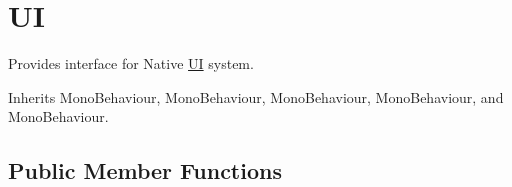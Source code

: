\hypertarget{class_voxel_busters_1_1_native_plugins_1_1_u_i}{}\section{U\+I}
\label{class_voxel_busters_1_1_native_plugins_1_1_u_i}


Provides interface for Native \hyperlink{class_voxel_busters_1_1_native_plugins_1_1_u_i}{U\+I} system.  




Inherits Mono\+Behaviour, Mono\+Behaviour, Mono\+Behaviour, Mono\+Behaviour, and Mono\+Behaviour.

\subsection*{Public Member Functions}
